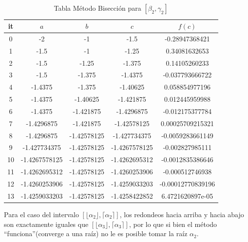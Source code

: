 \documentclass{article} %
\begin{document}
\begin{table}[H]
\centering
\begin{tabular}{|c|c|c|c|c|}
\hline
it & $a$ & $b$ & $c$ & $f(c)$\\
\hline
0 & -2 & -1 & -1.5 & -0.28947368421\\
1 & -1.5 & -1 & -1.25 & 0.34081632653\\
2 & -1.5 & -1.25 & -1.375 & 0.14105260233\\
3 & -1.5 & -1.375 & -1.4375 & -0.037793666722\\
4 & -1.4375 & -1.375 & -1.40625 & 0.058854977196\\
5 & -1.4375 & -1.40625 & -1.421875 & 0.012445959988\\
6 & -1.4375 & -1.421875 & -1.4296875 & -0.012175377784\\
7 & -1.4296875 & -1.421875 & -1.42578125 & 0.00025709215321\\
8 & -1.4296875 & -1.42578125 & -1.427734375 & -0.0059283661149\\
9 & -1.427734375 & -1.42578125 & -1.4267578125 & -0.002827985111\\
10 & -1.4267578125 & -1.42578125 & -1.4262695312 & -0.0012835386646\\
11 & -1.4262695312 & -1.42578125 & -1.4260253906 & -0.000512746938\\
12 & -1.4260253906 & -1.42578125 & -1.4259033203 & -0.00012770839196\\
13 & -1.4259033203 & -1.42578125 & -1.4258422852 & 6.4721620897e-05\\
\hline
\end{tabular}
\caption{Tabla Método Bisección para $[\beta_2 ,\gamma_2]$}
\end{table}

Para el caso del intervalo $[\lfloor \alpha_2 \rfloor,\lceil \alpha_2 \rceil]$, los redondeos hacia arriba y hacia abajo son exactamente iguales que $[\lfloor \alpha_3 \rfloor,\lceil \alpha_3 \rceil]$, por lo que si bien el método ``funciona''(converge a una raíz) no le es posible tomar la raíz $\alpha_2$.
\end{document}
